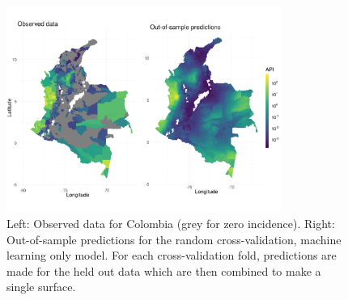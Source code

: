 \documentclass[11pt]{article}
\begin{document}
\begin{figure}
\centering
\includegraphics[trim={0 30mm 0 40mm}, width = 0.8\textwidth]{figs/col_obs_pred_map_ml.png} %
\caption{
  Left: Observed data for Colombia (grey for zero incidence). Right: Out-of-sample predictions for the random cross-validation, machine learning only model. For each cross-validation fold, predictions are made for the held out data which are then combined to make a single surface.
}
\label{f:map}
\end{figure}


\end{document}
